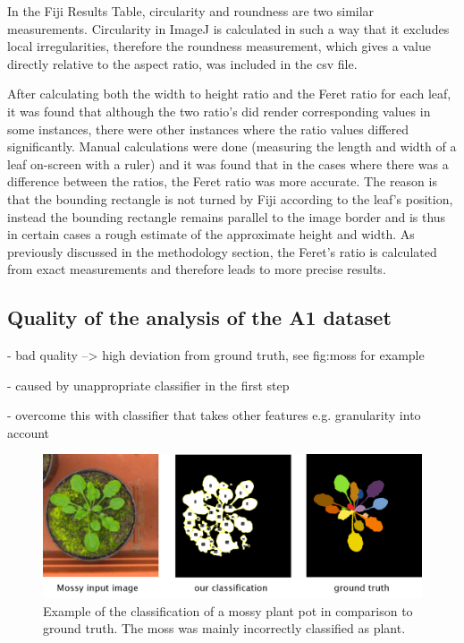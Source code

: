 \documentclass[paper=A4,bibliography=totocnumbered]{scrartcl}
\begin{document}
In  the Fiji Results Table, circularity and roundness are two similar measurements. Circularity in ImageJ is calculated in such a way that it excludes local irregularities, therefore the roundness measurement, which gives a value directly relative to the aspect ratio, was included in the csv file. 

After calculating both the width to height ratio and the Feret ratio for each leaf, it was found that although the two ratio's did render corresponding values in some instances, there were other instances where the ratio values differed significantly. Manual calculations were done (measuring the length and width of a leaf on-screen with a ruler) and it was found that in the cases where there was a difference between the ratios, the Feret ratio was more accurate. The reason is that the bounding rectangle is not turned by Fiji according to the leaf's position, instead the bounding rectangle remains parallel to the image border and is thus in certain cases a rough estimate of the approximate height and width. As previously discussed in the methodology section, the Feret's ratio is calculated from exact measurements and therefore leads to more precise results. 

\subsection{Quality of the analysis of the A1 dataset}
- bad quality --> high deviation from ground truth, see fig:moss for example

- caused by unappropriate classifier in the first step

- overcome this with classifier that takes other features e.g. granularity into account 

\begin{figure}
	\centering
	\includegraphics[width=13cm]{pic/moss}
	\caption{Example of the classification of a mossy plant pot in comparison to ground truth. The moss was mainly incorrectly classified as plant.}
	\label{fig:moss}
\end{figure}
\end{document}
